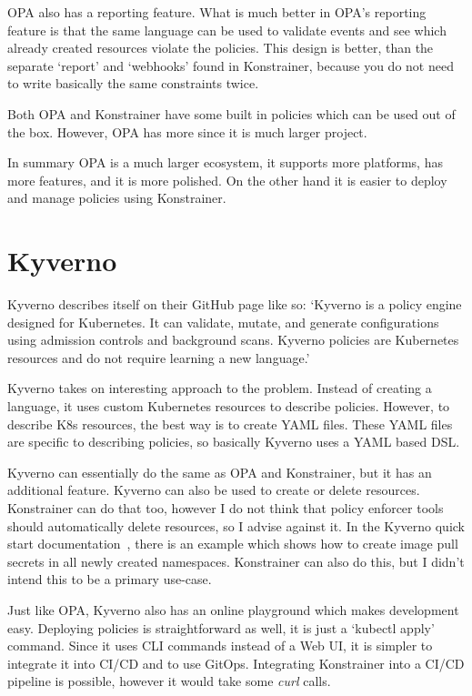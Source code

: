 OPA also has a reporting feature. What is much better in OPA's reporting feature is that the same language can be used to validate events and see which already created resources violate the policies. This design is better, than the separate `report' and `webhooks' found in Konstrainer, because you do not need to write basically the same constraints twice.

Both OPA and Konstrainer have some built in policies which can be used out of the box. However, OPA has more since it is much larger project.

In summary OPA is a much larger ecosystem, it supports more platforms, has more features, and it is more polished. On the other hand it is easier to deploy and manage policies using Konstrainer.

\section{Kyverno}

Kyverno describes itself on their GitHub page like so:
`Kyverno is a policy engine designed for Kubernetes. It can validate, mutate, and generate configurations using admission controls and background scans. Kyverno policies are Kubernetes resources and do not require learning a new language.'~\cite{Kyverno}

Kyverno takes on interesting approach to the problem. Instead of creating a language, it uses custom Kubernetes resources to describe policies. However, to describe K8s resources, the best way is to create YAML files. These YAML files are specific to describing policies, so basically Kyverno uses a YAML based DSL.

Kyverno can essentially do the same as OPA and Konstrainer, but it has an additional feature. Kyverno can also be used to create or delete resources. Konstrainer can do that too, however I do not think that policy enforcer tools should automatically delete resources, so I advise against it. In the Kyverno quick start documentation~\cite{KyvernoQuick}, there is an example which shows how to create image pull secrets in all newly created namespaces. Konstrainer can also do this, but I didn't intend this to be a primary use-case.

Just like OPA, Kyverno also has an online playground which makes development easy. Deploying policies is straightforward as well, it is just a `kubectl apply' command. Since it uses CLI commands instead of a Web UI, it is simpler to integrate it into CI/CD and to use GitOps. Integrating Konstrainer into a CI/CD pipeline is possible, however it would take some \emph{curl} calls.

